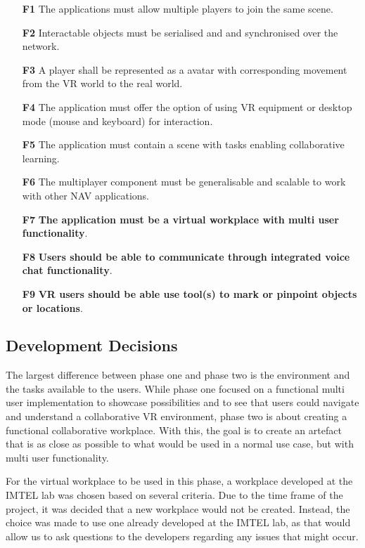 \begin{enumerate}
  \setlength\itemsep{0em}
  \item [\textbf{F1}] The applications must allow multiple players to join the same scene.
  \item [\textbf{F2}] Interactable objects must be serialised and and synchronised over the network.
  \item [\textbf{F3}] A player shall be represented as a avatar with corresponding movement from the VR world to the real world.
  \item [\textbf{F4}] The application must offer the option of using VR equipment or desktop mode (mouse and keyboard) for interaction.
  \item [\textbf{F5}] The application must contain a scene with tasks enabling collaborative learning.
  \item [\textbf{F6}] The multiplayer component must be generalisable and scalable to work with other NAV applications.
  \item [\textbf{F7}] \textbf{The application must be a virtual workplace with multi user functionality}.
  \item [\textbf{F8}] \textbf{Users should be able to communicate through integrated voice chat functionality}.
   \item [\textbf{F9}] \textbf{VR users should be able use tool(s) to mark or pinpoint objects or locations}.
\end{enumerate}

\subsection{Development Decisions}
The largest difference between phase one and phase two is the environment and the tasks available to the users. While phase one focused on a functional multi user implementation to showcase possibilities and to see that users could navigate and understand a collaborative VR environment, phase two is about creating a functional collaborative workplace. With this, the goal is to create an artefact that is as close as possible to what would be used in a normal use case, but with multi user functionality. 

For the virtual workplace to be used in this phase, a workplace developed at the IMTEL lab was chosen based on several criteria. Due to the time frame of the project, it was decided that a new workplace would not be created. Instead, the choice was made to use one already developed at the IMTEL lab, as that would allow us to ask questions to the developers regarding any issues that might occur. 

